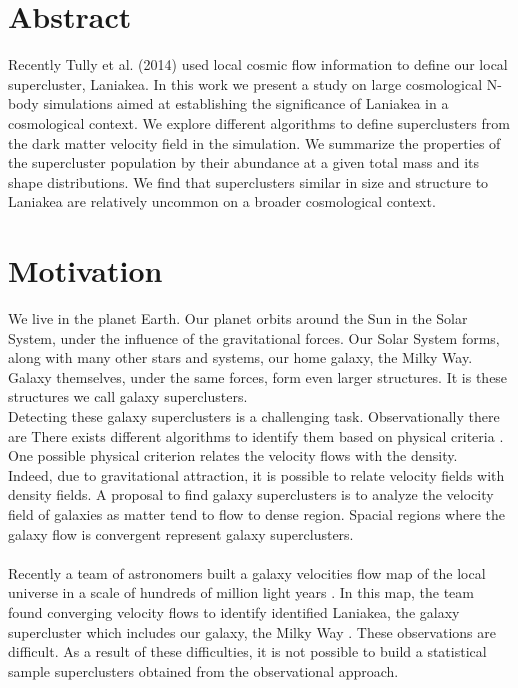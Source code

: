\documentclass[12pt]{article}
\begin{document}
\newpage
\section{Abstract}
Recently Tully et al. (2014)
 \cite{tully_laniakea_2014} used local cosmic flow
 information to define our local supercluster,
  Laniakea. 
In this work we present a study on large
 cosmological N-body
simulations aimed at establishing the significance
 of Laniakea in a
cosmological context.
We explore different algorithms to define
 superclusters from the dark
matter velocity field in the simulation. 
We summarize the properties of the supercluster
 population by their
abundance at a given total mass and its shape
 distributions.
We find that superclusters similar in size and
 structure to Laniakea are
relatively uncommon on a broader cosmological
 context.

\newpage
\tableofcontents
\newpage

\section{Motivation}

We live in the planet Earth. Our planet orbits
 around the Sun in the Solar System, under the
  influence of the gravitational forces. Our Solar
   System forms, along with many other stars and
    systems, our home galaxy, the Milky
    Way. Galaxy themselves, under the
  same forces, form even larger structures. It is
   these structures we call galaxy superclusters. \\
   

Detecting these galaxy superclusters is a challenging
 task. Observationally there are  There exists
    different algorithms to identify them based on
     physical criteria \cite{gott_iii_map_2005}. One
      possible physical criterion relates the velocity
       flows with the density.
\\

Indeed, due to gravitational attraction, it is possible
 to relate
  velocity fields with density fields. A proposal to
   find galaxy superclusters is to analyze the
    velocity field of galaxies as matter tend to flow
     to
     dense region. Spacial
      regions where the galaxy flow is convergent
       represent galaxy superclusters.\\
\\
Recently a team of astronomers built a galaxy velocities
 flow map
 of the local universe in a scale of hundreds of million
  light
  years \cite{tully_cosmicflows-2_2013}. In this map, the
   team found converging velocity flows to identify
    identified Laniakea, the galaxy supercluster
     which includes our galaxy, the Milky Way
      \cite{tully_laniakea_2014}. These observations
       are difficult. As a result of these
         difficulties, it is not possible to build a
          statistical sample superclusters obtained
           from the observational approach. 
\\   
\end{document}
